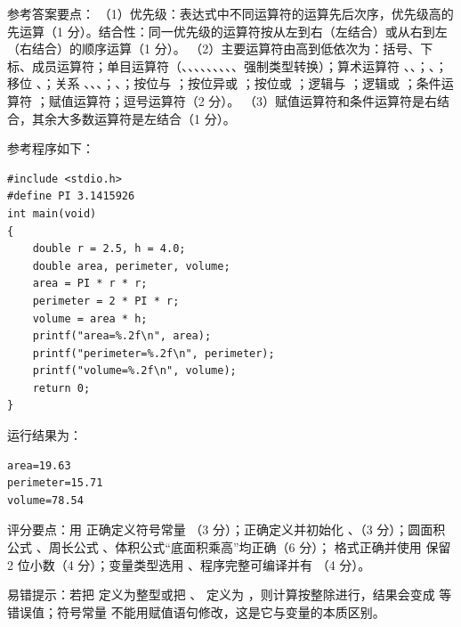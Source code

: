 \documentclass[a4paper,11pt]{article}
\begin{document}
\q 参考答案要点：
（1）优先级：表达式中不同运算符的运算先后次序，优先级高的先运算（1 分）。结合性：同一优先级的运算符按从左到右（左结合）或从右到左（右结合）的顺序运算（1 分）。
（2）主要运算符由高到低依次为：括号、下标、成员运算符；单目运算符（\code{!}、\code{\textasciitilde}、\code{++}、\code{--}、\code{+}、\code{-}、\code{*}、\code{\&}、、强制类型转换）；算术运算符 \code{*}、\code{/}、\code{\%}；\code{+}、\code{-}；移位 \code{<<}、\code{>>}；关系 \code{<}、\code{<=}、\code{>}、\code{>=}；\code{==}、\code{!=}；按位与 \code{\&}；按位异或 \code{\textasciicircum}；按位或 \code{|}；逻辑与 \code{\&\&}；逻辑或 \code{||}；条件运算符 ；赋值运算符；逗号运算符（2 分）。
（3）赋值运算符和条件运算符是右结合，其余大多数运算符是左结合（1 分）。


\q 参考程序如下：
\begin{lstlisting}[language={[custom]C}]
#include <stdio.h>
#define PI 3.1415926
int main(void)
{
    double r = 2.5, h = 4.0;
    double area, perimeter, volume;
    area = PI * r * r;
    perimeter = 2 * PI * r;
    volume = area * h;
    printf("area=%.2f\n", area);
    printf("perimeter=%.2f\n", perimeter);
    printf("volume=%.2f\n", volume);
    return 0;
}
\end{lstlisting}
\begin{analysis}运行结果为：
\begin{lstlisting}
area=19.63
perimeter=15.71
volume=78.54
\end{lstlisting}
评分要点：用  正确定义符号常量 （3 分）；正确定义并初始化 、（3 分）；圆面积公式 、周长公式 、体积公式“底面积乘高”均正确（6 分）； 格式正确并使用  保留 2 位小数（4 分）；变量类型选用 、程序完整可编译并有 （4 分）。\end{analysis}
\begin{analysis}易错提示：若把  定义为整型或把 、 定义为 ，则计算按整除进行，结果会变成  等错误值；符号常量  不能用赋值语句修改，这是它与变量的本质区别。\end{analysis}
\end{document}
